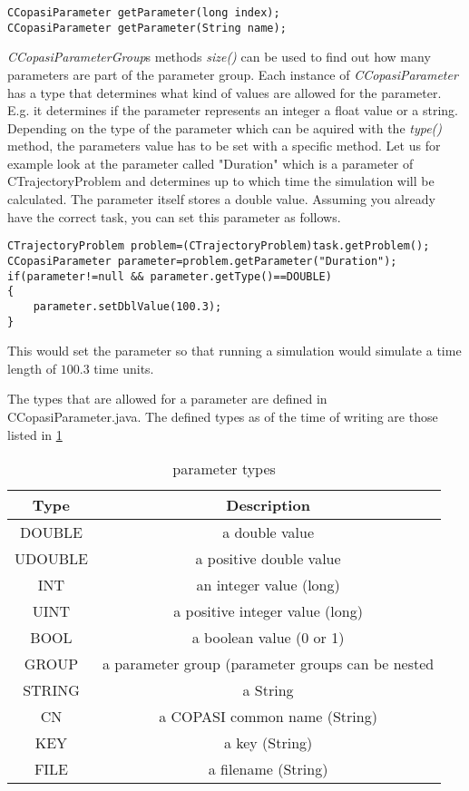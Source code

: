 \documentclass[a4,12pt]{article}
\begin{document}
\begin{lstlisting}
CCopasiParameter getParameter(long index);
CCopasiParameter getParameter(String name);
\end{lstlisting}

\textit{CCopasiParameterGroup}s methods \textit{size()} can be used to find out how many parameters are part of the parameter group.
Each instance of \textit{CCopasiParameter} has a type that determines what kind of values are allowed for the parameter. E.g. it determines if the parameter represents an integer a float value or a string.
Depending on the type of the parameter which can be aquired with the \textit{type()} method, the parameters value has to be set with a specific method.
Let us for example look at the parameter called "Duration" which is a parameter of CTrajectoryProblem and determines up to which time the simulation will be calculated. The parameter itself stores a double value. Assuming you already have the correct task, you can set this parameter as follows.    

\begin{lstlisting}
CTrajectoryProblem problem=(CTrajectoryProblem)task.getProblem();
CCopasiParameter parameter=problem.getParameter("Duration");
if(parameter!=null && parameter.getType()==DOUBLE)
{
    parameter.setDblValue(100.3);
}
\end{lstlisting}

This would set the parameter so that running a simulation would simulate a time length of $100.3$ time units. 

The types that are allowed for a parameter are defined in CCopasiParameter.java. The defined types as of the time of writing are those listed in \ref{ParameterTypes}

\begin{table}[ht]
\begin{tabular}{ c | c }
\hline
Type & Description \\ \hline \hline
DOUBLE &  a double value \\ \hline
UDOUBLE & a positive double value \\ \hline 
INT & an integer value (long) \\ \hline 
UINT & a positive integer value (long) \\ \hline 
BOOL & a boolean value (0 or 1) \\ \hline 
GROUP & a parameter group (parameter groups can be nested \\ \hline 
STRING & a String \\ \hline
CN & a COPASI common name (String) \\ \hline
KEY & a key (String) \\ \hline
FILE & a filename (String) \\ \hline
\end{tabular}
\label{ParameterTypes}
\caption{parameter types}
\end{table}
\end{document}
